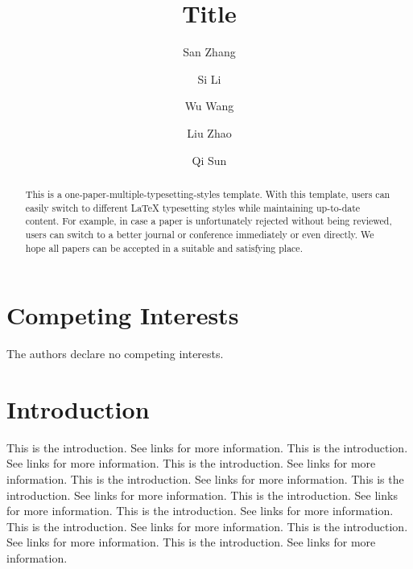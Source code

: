 \documentclass[runningheads]{llncs}
\begin{document}
\title{Title}

\author{
	San Zhang
	\and Si Li
	\and Wu Wang
	\and Liu Zhao
	\and Qi Sun
}



\maketitle

\renewcommand{\thefootnote}{}

\begin{abstract}
	This is a one-paper-multiple-typesetting-styles template. With this template, users can easily switch to different LaTeX typesetting styles while maintaining up-to-date content. For example, in case a paper is unfortunately rejected without being reviewed, users can switch to a better journal or conference immediately or even directly. We hope all papers can be accepted in a suitable and satisfying place. 
\end{abstract}

\section*{Competing Interests}

The authors declare no competing interests.

\section{Introduction}
\label{sec:1}

This is the introduction. See links \cite{liu2024efficient, yang2026builder, yang2025checker} for more information. This is the introduction. See links \cite{liu2024efficient, yang2026builder, yang2025checker} for more information. This is the introduction. See links \cite{liu2024efficient, yang2026builder, yang2025checker} for more information. This is the introduction. See links \cite{liu2024efficient, yang2026builder, yang2025checker} for more information. This is the introduction. See links \cite{liu2024efficient, yang2026builder, yang2025checker} for more information. This is the introduction. See links \cite{liu2024efficient, yang2026builder, yang2025checker} for more information. This is the introduction. See links \cite{liu2024efficient, yang2026builder, yang2025checker} for more information. This is the introduction. See links \cite{liu2024efficient, yang2026builder, yang2025checker} for more information. This is the introduction. See links \cite{liu2024efficient, yang2026builder, yang2025checker} for more information. This is the introduction. See links \cite{liu2024efficient, yang2026builder, yang2025checker} for more information. 
\end{document}
